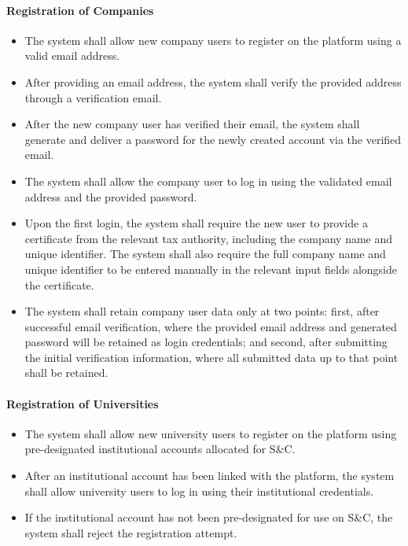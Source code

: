 \paragraph{Registration of Companies}
\begin{itemize}[label={[\textbf{FR}]}, align=left, leftmargin=*]
    \item {} The system shall allow new company users to register on the platform using a valid email address.
    \item {} After providing an email address, the system shall verify the provided address through a verification email.
    \item {} After the new company user has verified their email, the system shall generate and deliver a password for the newly created account via the verified email.
    \item {} The system shall allow the company user to log in using the validated email address and the provided password.
    \item {} Upon the first login, the system shall require the new user to provide a certificate from the relevant tax authority, including the company name and unique identifier. The system shall also require the full company name and unique identifier to be entered manually in the relevant input fields alongside the certificate.
    \item {} The system shall retain company user data only at two points: first, after successful email verification, where the provided email address and generated password will be retained as login credentials; and second, after submitting the initial verification information, where all submitted data up to that point shall be retained.
\end{itemize}



\paragraph{Registration of Universities}
\begin{itemize}[label={[\textbf{FR}]}, align=left, leftmargin=*]
    \item {} The system shall allow new university users to register on the platform using pre-designated institutional accounts allocated for S\&C.
    \item {} After an institutional account has been linked with the platform, the system shall allow university users to log in using their institutional credentials.
    \item {} If the institutional account has not been pre-designated for use on S\&C, the system shall reject the registration attempt.
\end{itemize}

